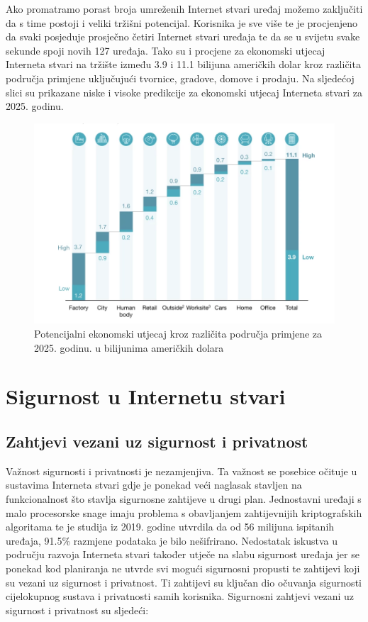 \documentclass[times, utf8, diplomski]{fer}
\begin{document}
Ako promatramo porast broja umreženih Internet stvari uređaj možemo zaključiti da s time postoji i veliki tržišni potencijal. Korisnika je sve više te je procjenjeno da svaki posjeduje prosječno četiri Internet stvari uređaja te da se u svijetu svake sekunde spoji novih 127 uređaja. Tako su i procjene za ekonomski utjecaj Interneta stvari na tržište između 3.9 i 11.1 bilijuna američkih dolar kroz različita područja primjene uključujući tvornice, gradove, domove i prodaju\citep{Patel2018Jan}. Na sljedećoj slici su prikazane niske i visoke predikcije za ekonomski utjecaj Interneta stvari za 2025. godinu.
\begin{figure}[H]
    \centering
    \includegraphics[width=12cm]{images/iot-economic-impact.png}
    \caption{Potencijalni ekonomski utjecaj kroz različita područja primjene za 2025. godinu. u bilijunima američkih dolara\citep{Patel2018Jan}}
    \label{fig:market}
\end{figure}

\chapter{Sigurnost u Internetu stvari}
\section{Zahtjevi vezani uz sigurnost i privatnost}
Važnost sigurnosti i privatnosti je nezamjenjiva. Ta važnost se posebice očituje u sustavima Interneta stvari gdje je ponekad veći naglasak stavljen na funkcionalnost što stavlja sigurnosne zahtijeve u drugi plan. Jednostavni uređaji s malo procesorske snage imaju problema s obavljanjem zahtijevnijih kriptografskih algoritama te je studija iz 2019. godine utvrdila da od 56 milijuna ispitanih uređaja, 91.5\% razmjene podataka je bilo nešifrirano\citep{Greene2019May}. Nedostatak iskustva u području razvoja Interneta stvari također utječe na slabu sigurnost uređaja jer se ponekad kod planiranja ne utvrde svi mogući sigurnosni propusti te zahtijevi koji su vezani uz sigurnost i privatnost. Ti zahtijevi su ključan dio očuvanja sigurnosti cijelokupnog sustava i privatnosti samih korisnika. Sigurnosni zahtjevi vezani uz sigurnost i privatnost su sljedeći\citep{InternetStvari}:
\end{document}
